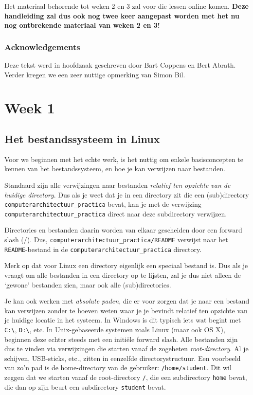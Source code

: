 \documentclass[a4paper,twoside,openany]{memoir}
\begin{document}
Het materiaal behorende tot weken 2 en 3 zal voor die lessen online komen.
\textbf{Deze handleiding zal dus ook nog twee keer aangepast worden met het nu
nog ontbrekende materiaal van weken 2 en 3!}

\section{Acknowledgements}
Deze tekst werd in hoofdzaak geschreven door Bart Coppens en Bert Abrath. Verder
kregen we een zeer nuttige opmerking van Simon Bil.

\part{Week 1}
\chapter{Het bestandssysteem in Linux}
Voor we beginnen met het echte werk, is het nuttig om enkele basisconcepten
te kennen van het bestandssysteem, en hoe je kan verwijzen naar bestanden.

Standaard zijn alle verwijzingen naar bestanden \emph{relatief ten opzichte van
de huidige directory}. Dus als je weet dat je in een directory zit die een
(sub)directory \verb!computerarchitectuur_practica! bevat, kan
je met de verwijzing \verb!computerarchitectuur_practica! direct naar deze
subdirectory verwijzen.

Directories en bestanden daarin worden van elkaar gescheiden door een forward
slash (/). Dus, \verb!computerarchitectuur_practica/README! verwijst naar
het \verb!README!-bestand in de \verb!computerarchitectuur_practica! directory.

Merk op dat voor Linux een directory eigenlijk een speciaal bestand is. Dus
als je vraagt om alle bestanden in een directory op te lijsten, zal je dus
niet alleen de `gewone' bestanden zien, maar ook alle (sub)directories.

Je kan ook werken met \emph{absolute paden}, die er voor zorgen dat je naar
een bestand kan verwijzen zonder te hoeven weten waar je je bevindt relatief
ten opzichte van je huidige locatie in het systeem. In Windows is dit typisch iets wat
begint met \verb!C:\!, \verb!D:\!, etc. In Unix-gebaseerde systemen zoals
Linux (maar ook OS X),
beginnen deze echter steeds met een initiële forward slash. Alle bestanden zijn
dus te vinden via verwijzingen die starten vanaf de zogeheten
\emph{root-directory}. Al je schijven, USB-sticks, etc., zitten in eenzelfde
directorystructuur. Een voorbeeld van zo'n pad is de
home-directory van de gebruiker: \verb!/home/student!. Dit wil zeggen dat we starten vanaf de
root-directory \verb!/!, die een subdirectory \verb!home! bevat, die dan op zijn
beurt een subdirectory \verb!student! bevat.
\end{document}
